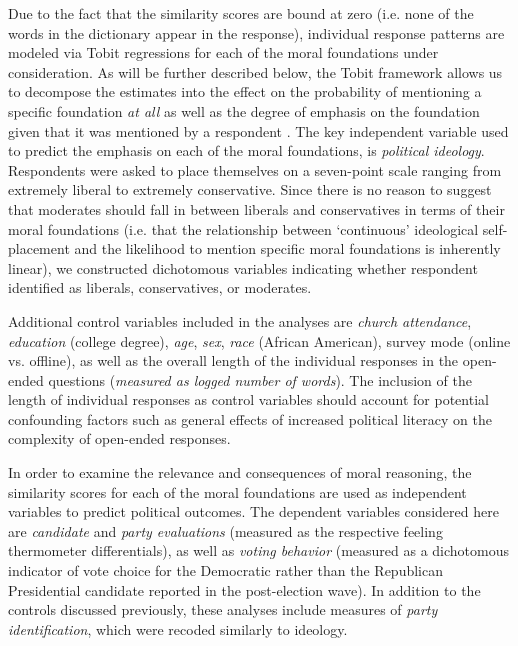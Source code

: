 \documentclass[12pt]{article}
\begin{document}
Due to the fact that the similarity scores are bound at zero (i.e. none of the words in the dictionary appear in the response), individual response patterns are modeled via Tobit regressions for each of the moral foundations under consideration. As will be further described below, the Tobit framework allows us to decompose the estimates into the effect on the probability of mentioning a specific foundation \textit{at all} as well as the degree of emphasis on the foundation given that it was mentioned by a respondent \citep[see][for details on the decomposition of Tobit model estimates]{mcdonald1980uses}. The key independent variable used to predict the emphasis on each of the moral foundations, is \textit{political ideology}. Respondents were asked to place themselves on a seven-point scale ranging from extremely liberal to extremely conservative. Since there is no reason to suggest that moderates should fall in between liberals and conservatives in terms of their moral foundations (i.e. that the relationship between `continuous' ideological self-placement and the likelihood to mention specific moral foundations is inherently linear), we constructed dichotomous variables indicating whether respondent identified as liberals, conservatives, or moderates.

Additional control variables included in the analyses are \textit{church attendance}, \textit{education} (college degree), \textit{age}, \textit{sex}, \textit{race} (African American), survey mode (online vs. offline), as well as the overall length of the individual responses in the open-ended questions (\textit{measured as logged number of words}). The inclusion of the length of individual responses as control variables should account for potential confounding factors such as general effects of increased political literacy on the complexity of open-ended responses.

In order to examine the relevance and consequences of moral reasoning, the similarity scores for each of the moral foundations are used as independent variables to predict political outcomes. The dependent variables considered here are \textit{candidate} and \textit{party evaluations} (measured as the respective feeling thermometer differentials), as well as \textit{voting behavior} (measured as a dichotomous indicator of vote choice for the Democratic rather than the Republican Presidential candidate reported in the post-election wave). In addition to the controls discussed previously, these analyses include measures of \textit{party identification}, which were recoded similarly to ideology.
\end{document}
